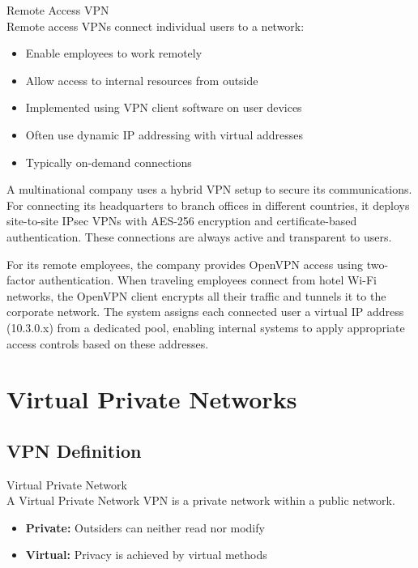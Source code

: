 \begin{concept}{Remote Access VPN}\\
Remote access VPNs connect individual users to a network:
\begin{itemize}
    \item Enable employees to work remotely
    \item Allow access to internal resources from outside
    \item Implemented using VPN client software on user devices
    \item Often use dynamic IP addressing with virtual addresses
    \item Typically on-demand connections
\end{itemize}
\end{concept}

\begin{example}
A multinational company uses a hybrid VPN setup to secure its communications. For connecting its headquarters to branch offices in different countries, it deploys site-to-site IPsec VPNs with AES-256 encryption and certificate-based authentication. These connections are always active and transparent to users.

For its remote employees, the company provides OpenVPN access using two-factor authentication. When traveling employees connect from hotel Wi-Fi networks, the OpenVPN client encrypts all their traffic and tunnels it to the corporate network. The system assigns each connected user a virtual IP address (10.3.0.x) from a dedicated pool, enabling internal systems to apply appropriate access controls based on these addresses.
\end{example}

\section{Virtual Private Networks}

\subsection{VPN Definition}

\begin{definition}{Virtual Private Network}\\
    A Virtual Private Network VPN is a private network within a public network.
    \begin{itemize}
        \item \textbf{Private:} Outsiders can neither read nor modify
        \item \textbf{Virtual:} Privacy is achieved by virtual methods
    \end{itemize}
\end{definition}

